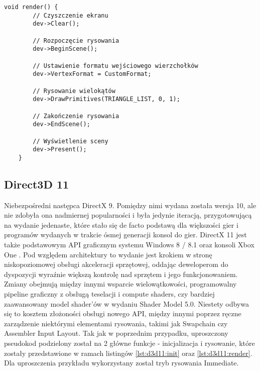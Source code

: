 \begin{lstlisting}[caption={Funkcja rysowania przy pomocy Managed DirectX}, label={lst:manageddx:drawing}]
	void render() {
		// Czyszczenie ekranu
		dev->Clear();
		
		// Rozpoczęcie rysowania
		dev->BeginScene();
		
		// Ustawienie formatu wejściowego wierzchołków
		dev->VertexFormat = CustomFormat;
		
		// Rysowanie wielokątów
		dev->DrawPrimitives(TRIANGLE_LIST, 0, 1);
		
		// Zakończenie rysowania
		dev->EndScene();
		
		// Wyświetlenie sceny
		dev->Present();
	}
\end{lstlisting}

\subsection{Direct3D 11}

Niebezpośredni następca DirectX 9. Pomiędzy nimi wydana została wersja
10, ale nie zdobyła ona nadmiernej popularności i była jedynie iteracją,
przygotowującą na wydanie jedenaste, które stało się de facto podstawą
dla większości gier i programów wydanych w trakcie ósmej generacji
konsol do gier. DirectX 11 jest także podstawowym API graficznym systemu
Windows 8 / 8.1 oraz konsoli Xbox One \cite{ms:raisingbar:2024}. Pod względem architektury to wydanie jest krokiem w stronę
niskopoziomowej obsługi akceleracji sprzętowej, oddając deweloperom do
dyspozycji wyraźnie większą kontrolę nad sprzętem i jego
funkcjonowaniem. Zmiany obejmują między innymi wsparcie wielowątkowości,
programowalny pipeline graficzny z obsługą teselacji i compute shaders,
czy bardziej zaawansowany model shader'ów w wydaniu Shader Model 5.0. Niestety odbywa się to kosztem złożoności obsługi nowego API, między
innymi poprzez ręczne zarządzenie niektórymi elementami rysowania,
takimi jak Swapchain czy Assembler Input Layout. Tak jak w poprzednim przypadku, uproszczony pseudokod podzielony został
na 2 główne funkcje - inicjalizacja i rysowanie, które zostały przedstawione w ramach listingów \ref{lst:d3d11:init} oraz \ref{lst:d3d11:render}. Dla uproszczenia przykładu wykorzystany został tryb rysowania Immediate.

